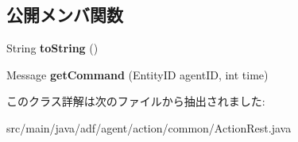 \subsection*{公開メンバ関数}
\begin{DoxyCompactItemize}
\item 
\hypertarget{classadf_1_1agent_1_1action_1_1common_1_1ActionRest_a739ba879f9ae9da9a46db83914026ff4}{}\label{classadf_1_1agent_1_1action_1_1common_1_1ActionRest_a739ba879f9ae9da9a46db83914026ff4} 
String {\bfseries to\+String} ()
\item 
\hypertarget{classadf_1_1agent_1_1action_1_1common_1_1ActionRest_a48270767d6992f55bd6184e942a6436b}{}\label{classadf_1_1agent_1_1action_1_1common_1_1ActionRest_a48270767d6992f55bd6184e942a6436b} 
Message {\bfseries get\+Command} (Entity\+ID agent\+ID, int time)
\end{DoxyCompactItemize}


このクラス詳解は次のファイルから抽出されました\+:\begin{DoxyCompactItemize}
\item 
src/main/java/adf/agent/action/common/Action\+Rest.\+java\end{DoxyCompactItemize}
